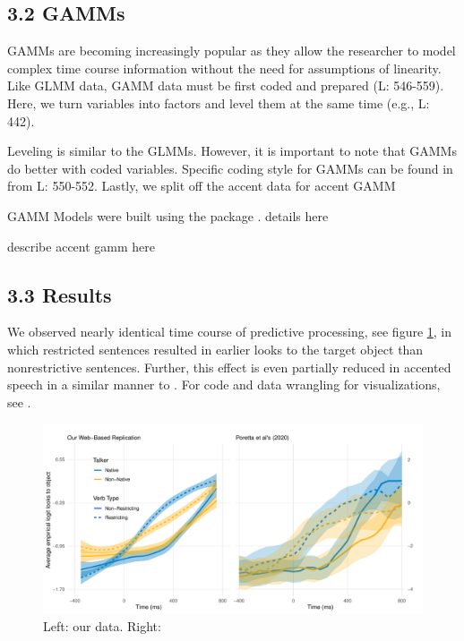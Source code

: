 \subsection{3.2 GAMMs}
GAMMs are becoming increasingly popular as they allow the researcher to model complex time course information without the need for assumptions of linearity. Like GLMM data, GAMM data must be first coded and prepared (L: 546-559). Here, we turn variables into factors and level them at the same time (e.g., L: 442). 

Leveling is similar to the GLMMs. However, it is important to note that GAMMs do better with coded variables. Specific coding style for GAMMs can be found in  from L: 550-552. Lastly, we split off the accent data for accent GAMM



GAMM Models were built using the  package \parencite{mgcv_wood_2017}. details here



describe accent gamm here





\subsection{3.3 Results}

 We observed nearly identical time course of predictive processing, see figure \ref{fig:smooth}, in which restricted sentences resulted in earlier looks to the target object than nonrestrictive sentences. Further, this effect is even partially reduced in accented speech in a similar manner to \textcite{Porretta_et_al_2020}. For  code and data wrangling for visualizations, see .

\begin{figure}[h]
    \centering
    \includegraphics[width=\textwidth]{figures/smooth_comparison_plot.pdf}
    \caption{Left: our data. Right: \textcite{Porretta_et_al_2020}}
    \label{fig:smooth}
\end{figure}

